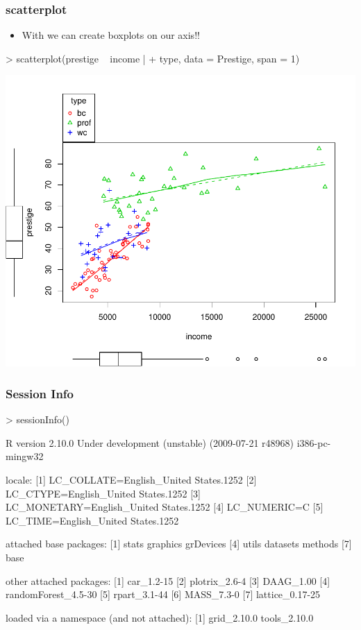 \begin{frame}
  \frametitle{scatterplot}
  \begin{itemize}
  \item With  we can create boxplots on our axis!!
  \end{itemize}
\begin{Schunk}
\begin{Sinput}
> scatterplot(prestige ~ income | 
+     type, data = Prestige, span = 1)
\end{Sinput}
\end{Schunk}
\includegraphics{plots/fig-039}
\end{frame}

\begin{frame}
  \frametitle{Session Info}
  \scriptsize
\begin{Schunk}
\begin{Sinput}
> sessionInfo()
\end{Sinput}
\begin{Soutput}
R version 2.10.0 Under development (unstable) (2009-07-21 r48968) 
i386-pc-mingw32 

locale:
[1] LC_COLLATE=English_United States.1252 
[2] LC_CTYPE=English_United States.1252   
[3] LC_MONETARY=English_United States.1252
[4] LC_NUMERIC=C                          
[5] LC_TIME=English_United States.1252    

attached base packages:
[1] stats     graphics  grDevices
[4] utils     datasets  methods  
[7] base     

other attached packages:
[1] car_1.2-15         
[2] plotrix_2.6-4      
[3] DAAG_1.00          
[4] randomForest_4.5-30
[5] rpart_3.1-44       
[6] MASS_7.3-0         
[7] lattice_0.17-25    

loaded via a namespace (and not attached):
[1] grid_2.10.0  tools_2.10.0
\end{Soutput}
\end{Schunk}
\end{frame}


